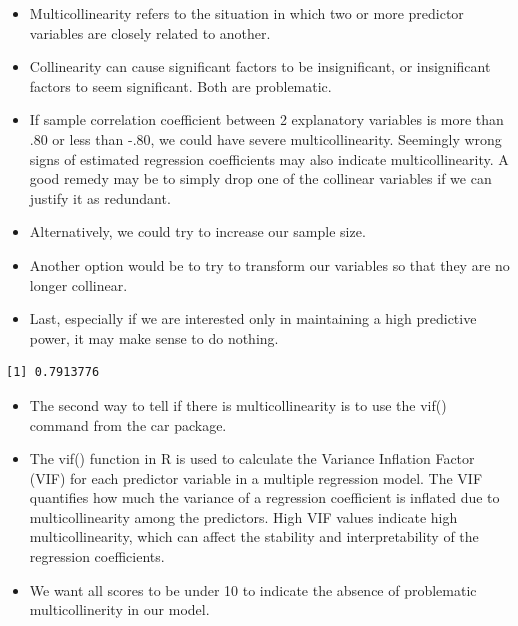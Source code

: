 \documentclass[
  letterpaper,
  DIV=11,
  numbers=noendperiod]{scrreprt}
\newenvironment{Shaded}{\begin{snugshade}}{\end{snugshade}}
\newcommand{\DocumentationTok}[1]{\textcolor[rgb]{0.37,0.37,0.37}{\textit{#1}}}
\newcommand{\FunctionTok}[1]{\textcolor[rgb]{0.28,0.35,0.67}{#1}}
\newcommand{\NormalTok}[1]{\textcolor[rgb]{0.00,0.23,0.31}{#1}}
\newcommand{\SpecialCharTok}[1]{\textcolor[rgb]{0.37,0.37,0.37}{#1}}
\providecommand{\tightlist}{%
  \setlength{\itemsep}{0pt}\setlength{\parskip}{0pt}}\usepackage{longtable,booktabs,array}
\begin{document}
\begin{itemize}
\tightlist
\item
  Multicollinearity refers to the situation in which two or more
  predictor variables are closely related to another.
\item
  Collinearity can cause significant factors to be insignificant, or
  insignificant factors to seem significant. Both are problematic.
\item
  If sample correlation coefficient between 2 explanatory variables is
  more than .80 or less than -.80, we could have severe
  multicollinearity. Seemingly wrong signs of estimated regression
  coefficients may also indicate multicollinearity. A good remedy may be
  to simply drop one of the collinear variables if we can justify it as
  redundant.
\item
  Alternatively, we could try to increase our sample size.
\item
  Another option would be to try to transform our variables so that they
  are no longer collinear.
\item
  Last, especially if we are interested only in maintaining a high
  predictive power, it may make sense to do nothing.
\end{itemize}

\begin{Shaded}
\end{Shaded}

\begin{verbatim}
[1] 0.7913776
\end{verbatim}

\begin{itemize}
\tightlist
\item
  The second way to tell if there is multicollinearity is to use the
  vif() command from the car package.
\item
  The vif() function in R is used to calculate the Variance Inflation
  Factor (VIF) for each predictor variable in a multiple regression
  model. The VIF quantifies how much the variance of a regression
  coefficient is inflated due to multicollinearity among the predictors.
  High VIF values indicate high multicollinearity, which can affect the
  stability and interpretability of the regression coefficients.
\item
  We want all scores to be under 10 to indicate the absence of
  problematic multicollinerity in our model.
\end{itemize}
\end{document}
